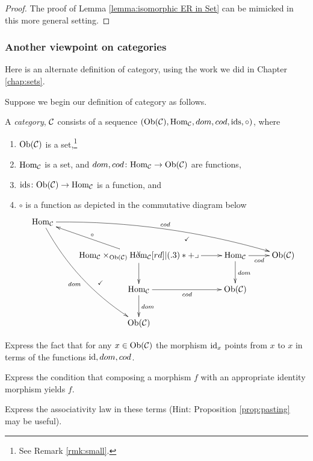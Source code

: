\begin{proof}

The proof of Lemma \ref{lemma:isomorphic ER in Set} can be mimicked in this more general setting.

\end{proof}


\subsubsection{Another viewpoint on categories}

Here is an alternate definition of category, using the work we did in Chapter \ref{chap:sets}.

\begin{exercise}\label{exc:cat in set}

Suppose we begin our definition of category as follows. 

A {\em category}, $\mathcal{C}$ consists of a sequence $(\textnormal{Ob}(\mathcal{C}),\textnormal{Hom}_\mathcal{C},dom,cod,\textnormal{ids},\circ)$, where 
\begin{enumerate}
\item $\textnormal{Ob}(\mathcal{C})$ is a set,\footnote{See Remark \ref{rmk:small}.}
\item $\textnormal{Hom}_\mathcal{C}$ is a set, and $dom,cod\colon\textnormal{Hom}_\mathcal{C}\rightarrow\textnormal{Ob}(\mathcal{C})$ are functions, 
\item $\textnormal{ids}\colon\textnormal{Ob}(\mathcal{C})\rightarrow\textnormal{Hom}_\mathcal{C}$ is a function, and 
\item $\circ$ is a function as depicted in the commutative diagram below
\begin{align}\label{dia:pullback version of cat}
\xymatrix{
\Hom_\mcC\ar@/^1pc/[drrr]^{cod}\ar@/_1pc/[dddr]_{dom}&&\\
&\Hom_\mcC\times_{\Ob(\mcC)}\Hom_\mcC\ar@{}[ur]|{\checkmark}\ar@{}[ddl]|(.4){\checkmark}\ar[ul]_\circ\ar[r]\ar[d]\ullimit&\Hom_\mcC\ar[r]_{cod}\ar[d]^{dom}&\Ob(\mcC)\\
&\Hom_\mcC\ar[r]_{cod}\ar[d]^{dom}&\Ob(\mcC)\\
&\Ob(\mcC)
}
\end{align}
\end{enumerate}

\sexc Express the fact that for any $x\in\textnormal{Ob}(\mathcal{C})$ the morphism $\textnormal{id}_x$ points from $x$ to $x$ in terms of the functions $\textnormal{id},dom,cod$. 
\item Express the condition that composing a morphism $f$ with an appropriate identity morphism yields $f$.
\item Express the associativity law in these terms (Hint: Proposition \ref{prop:pasting} may be useful).
\endsexc
\end{exercise}

